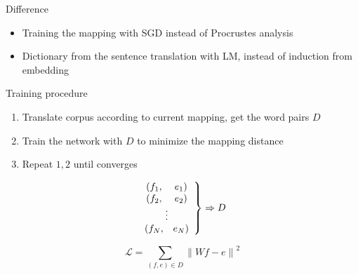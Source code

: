 \documentclass[11pt, a4paper, landscape]{article}
\begin{document}
	
	\NewPage
	\vfill
	Difference
	\begin{itemize}
		\item Training the mapping with SGD instead of Procrustes analysis
		\item Dictionary from the sentence translation with LM, instead of induction from embedding\\
	\end{itemize}
	Training procedure
	\begin{enumerate}
		\item Translate corpus according to current mapping, get the word pairs $D$
		\item Train the network with $D$ to minimize the mapping distance
		\item Repeat $1,2$ until converges
	\end{enumerate}

	\begin{minipage}[b]{0.5\textwidth}
		\[ 
		\left. \begin{array}{c c} 
		(f_1,& e_1)\\
		(f_2,& e_2)\\
		\multicolumn{2}{c}{\vdots}\\
		(f_N,& e_N)
		\end{array} \right\} 
		\Rightarrow D
		\]
		
	\end{minipage}
	\begin{minipage}[b]{0.3\textwidth}
		\[\mathcal{L} = \sum_{(f,e)\in D} {\lVert Wf - e \rVert}^2  \]
	\end{minipage}
	\vfill	

	\FinalPage
	

	
	
	\NewPage
	
	
	
\end{document}
